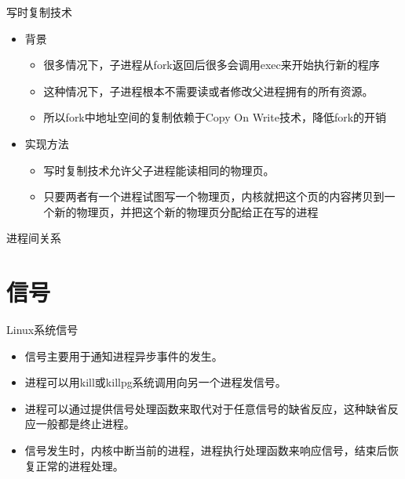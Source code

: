 \begin{frame}{写时复制技术}
\begin{itemize}
\item 背景
\begin{itemize}
\item 很多情况下，子进程从fork返回后很多会调用exec来开始执行新的程序
\item 这种情况下，子进程根本不需要读或者修改父进程拥有的所有资源。
\item 所以fork中地址空间的复制依赖于Copy On Write技术，降低fork的开销
\end{itemize}
\item 实现方法
\begin{itemize}
\item 写时复制技术允许父子进程能读相同的物理页。
\item 只要两者有一个进程试图写一个物理页，内核就把这个页的内容拷贝到一个新的物理页，并把这个新的物理页分配给正在写的进程
\end{itemize}
\end{itemize}
\end{frame}

\begin{frame}{进程间关系}
\begin{center}\end{center}
\end{frame}

\section{信号}
\begin{frame}{Linux系统信号}
\begin{itemize}
\item 信号主要用于通知进程异步事件的发生。 
\item 进程可以用kill或killpg系统调用向另一个进程发信号。
\item 进程可以通过提供信号处理函数来取代对于任意信号的缺省反应，这种缺省反应一般都是终止进程。
\item 信号发生时，内核中断当前的进程，进程执行处理函数来响应信号，结束后恢复正常的进程处理。
\end{itemize}
\end{frame}

